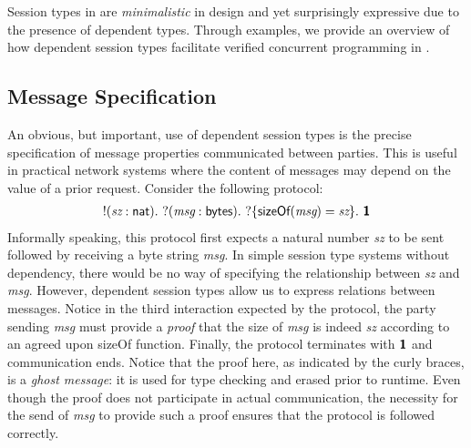 Session types in \TLLC{} are \emph{minimalistic} in design and yet surprisingly expressive
due to the presence of dependent types. Through examples, we provide an overview of
how dependent session types facilitate verified concurrent programming in \TLLC{}.

\subsection{Message Specification}\label{sec:message-specification}
An obvious, but important, use of dependent session types is the precise specification
of message properties communicated between parties. This is useful in practical network
systems where the content of messages may depend on the value of a prior request.
Consider the following protocol:
\begin{align*}
  !(\textit{sz}: \textsf{nat}).\
  ?(\textit{msg}: \textsf{bytes}).\ ?\{\textsf{sizeOf}(\textit{msg}) = \textit{sz}\}.\ \textbf{\textsf{1}}
\end{align*}
Informally speaking, this protocol first expects a natural number \textit{sz} to be sent
followed by receiving a byte string \textit{msg}. In simple session type systems without
dependency, there would be no way of specifying the relationship between \textit{sz} and
\textit{msg}. However, dependent session types allow us to express relations between messages.
Notice in the third interaction expected by the protocol, the party sending \textit{msg} must
provide a \emph{proof} that the size of \textit{msg} is indeed \textit{sz} according to
an agreed upon \textsf{sizeOf} function. Finally, the protocol terminates with $\textbf{\textsf{1}}$ and
communication ends. Notice that the proof here, as indicated by the curly braces, is a
\emph{ghost message}: it is used for type checking and erased prior to runtime. Even though
the proof does not participate in actual communication, the necessity for the send of
\textit{msg} to provide such a proof ensures that the protocol is followed correctly.

